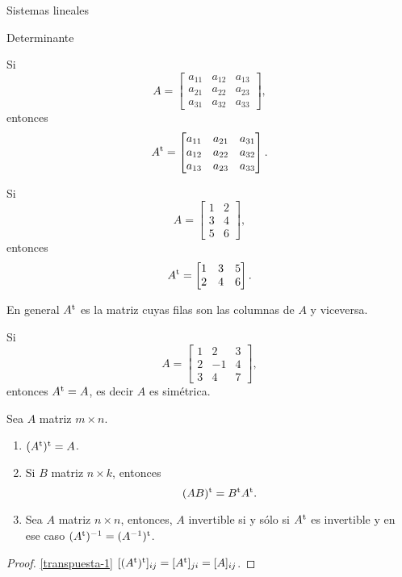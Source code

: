 \begin{chapter}{Sistemas lineales}
\begin{section}{Determinante}
    \begin{ejemplo*} Si
        $$A=\begin{bmatrix}a_{11}&a_{12}&a_{13}\\a_{21}&a_{22}&a_{23}\\a_{31}&a_{32}&a_{33}\end{bmatrix},$$ 
        entonces
        $$A^{\operatorname{t}}=\begin{bmatrix}a_{11}&a_{21}&a_{31}\\a_{12}&a_{22}&a_{32}\\a_{13}&a_{23}&a_{33}\end{bmatrix}.$$ 
    \end{ejemplo*}
    
    \begin{ejemplo*}
        Si $$A=\begin{bmatrix}1&2\\3&4\\5&6\end{bmatrix},$$ 
        entonces
        $$A^{\operatorname{t}}=\begin{bmatrix}1&3&5\\2&4&6\end{bmatrix}.$$ 
    \end{ejemplo*}
    
    
    En  general $A^{\operatorname{t}}$ es la matriz cuyas filas son las columnas de $A$ y viceversa. 
    
    \begin{ejemplo*}
        Si 
        \begin{equation*}
            A=\begin{bmatrix}1&2&3\\2&-1&4\\3&4&7\end{bmatrix},
        \end{equation*}
        entonces $A^{\operatorname{t}} =A$, es decir  $A$ es simétrica.
    \end{ejemplo*}
    
    \begin{proposicion}\label{prop-matriz-transpuesta} Sea $A$ matriz $m \times n$.
        \begin{enumerate}
            \item\label{transpuesta-1} $(A^{\operatorname{t}})^{\operatorname{t}} = A$.
            \item\label{transpuesta-2}  Si $B$ matriz $n \times k$,  entonces
            \begin{equation*}
            (AB)^{\operatorname{t}} = B^{\operatorname{t}} A^{\operatorname{t}}.
            \end{equation*} 
            \item\label{transpuesta-3}  Sea $A$ matriz $n \times n$, entonces, $A$ invertible si y sólo si  $A^{\operatorname{t}}$ es invertible y  en ese caso $(A^{\operatorname{t}})^{-1} = (A^{-1})^{\operatorname{t}}$.
        \end{enumerate}
    \end{proposicion}
    \begin{proof}
        \ref{transpuesta-1} 	$[(A^{\operatorname{t}})^{\operatorname{t}}]_{ij} = [A^{\operatorname{t}}]_{ji} = [A]_{ij}$. 


\end{proof}
\end{section}
\end{chapter}
